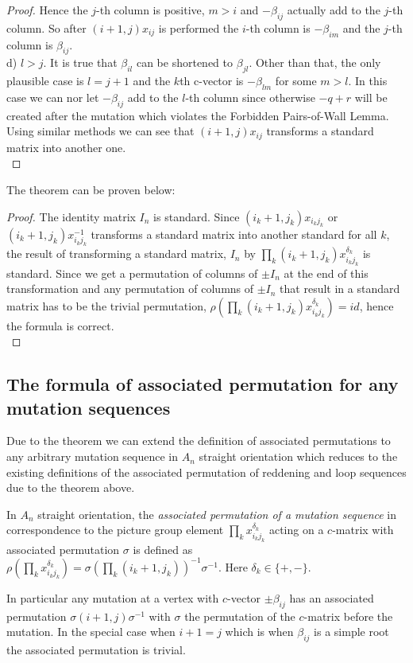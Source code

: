 \begin{proof}
\indent Hence the $j$-th column is positive, $m>i$ and $-\beta_{ij}$ actually add to the $j$-th column. So after $(i+1,j)x_{ij}$ is performed the $i$-th column is $-\beta_{im}$ and the $j$-th column is $\beta_{ij}$.\\
\indent d) $l>j$. It is true that $\beta_{il}$ can be shortened to $\beta_{jl}$. Other than that, the only plausible case is $l = j + 1$ and the $k$th c-vector is $-\beta_{lm}$ for some $m>l$. In this case we can nor let $-\beta_{ij}$ add to the $l$-th column since otherwise $-q+r$ will be created after the mutation which violates the Forbidden Pairs-of-Wall Lemma.\\
\indent Using similar methods we can see that $(i+1, j)x_{ij}$ transforms a standard matrix into another one.\\
\end{proof}
\indent The theorem can be proven below:\\
\begin{proof}
The identity matrix $I_n$ is standard. Since $(i_k+1,j_k)x_{i_kj_k}$ or $(i_k+1,j_k)x_{i_kj_k}^{-1}$ transforms a standard matrix into another standard for all $k$, the result of transforming a standard matrix, $I_n$ by $\prod_{k}(i_k+1,j_k)x_{i_kj_k}^{\delta_k}$ is standard. Since we get a permutation of columns of $\pm I_n$ at the end of this transformation and any permutation of columns of $\pm I_n$ that result in a standard matrix has to be the trivial permutation, $\rho(\prod_{k}(i_k+1,j_k)x_{i_kj_k}^{\delta_k})=id$, hence the formula is correct.\\
\end{proof}
\subsection{The formula of associated permutation for any mutation sequences}
\indent Due to the theorem we can extend the definition of associated permutations to any arbitrary mutation sequence in $A_n$ straight orientation which reduces to the existing definitions of the associated permutation of reddening and loop sequences due to the theorem above.
\begin{definition}
In $A_n$ straight orientation, the \textit{associated permutation of a mutation sequence} in correspondence to the picture group element $\prod_{k}x_{i_kj_k}^{\delta_k}$ acting on a $c$-matrix with associated permutation $\sigma$ is defined as $\rho(\prod_{k}x_{i_kj_k}^{\delta_k}) = \sigma(\prod_{k}(i_k+1,j_k))^{-1}\sigma^{-1}$. Here $\delta_k\in\{+,-\}$.\\
\end{definition}
\indent In particular any mutation at a vertex with $c$-vector $\pm\beta_{ij}$ has an associated permutation $\sigma(i+1,j)\sigma^{-1}$ with $\sigma$ the permutation of the $c$-matrix before the mutation. In the special case when $i+1=j$ which is when $\beta_{ij}$ is a simple root the associated permutation is trivial.\\ 